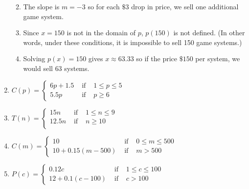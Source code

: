 \begin{enumerate}
\begin{enumerate}
\begin{center}
\end{center}



\item The slope is $m = -3$ so for each $\$3$ drop in price, we sell one additional game system.

\item   Since $x = 150$ is not in the domain of $p$, $p(150)$ is not defined.  (In other words, under these conditions, it is impossible to sell 150 game systems.)

\item Solving $p(x) = 150$ gives $x \approx 63.33$ so if the price  $\$150$ per system, we would sell $63$ systems.

\end{enumerate}



\item ${\displaystyle C(p) = \left\{ \begin{array}{rcl} 6p + 1.5 & \mbox{ if } & 1 \leq p \leq 5 \\
                                                            5.5p & \mbox{ if } & p\geq 6
                                     \end{array} \right. }$
                                     


\item  ${\displaystyle T(n) = \left\{ \begin{array}{rcl} 15n & \mbox{ if } & 1 \leq n \leq 9 \\
                                                            12.5n & \mbox{ if } & n \geq 10 \\ 
                                     \end{array} \right. }$
                                     

\item ${\displaystyle C(m) = \left\{ \begin{array}{rcl} 10 & \mbox{ if } & 0 \leq m \leq 500 \\
                                                            10+0.15(m-500) & \mbox{ if } & m > 500
                                     \end{array} \right. }$
                                     
\item ${\displaystyle P(c) = \left\{ \begin{array}{rcl} 0.12c & \mbox{ if } & 1 \leq c \leq 100 \\
                                                            12 + 0.1(c-100) & \mbox{ if } & c > 100 
                                     \end{array} \right. }$


\end{enumerate}
